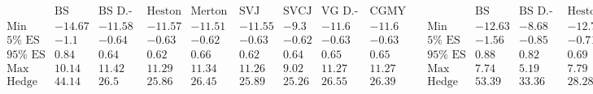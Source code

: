 \documentclass{article}
\begin{document}
\[\begin{array}{ccc}
\begin{array}{rrrrrrrrr}
 \text{} & \text{BS Delta} & \text{BS D.-Gamma} & \text{Heston D.-Vega} & \text{Merton D.-Gamma} & \text{SVJ D.-Vega} & \text{SVCJ D.-Vega} & \text{VG
D.-Gamma} & \text{CGMY D.-Gamma} \\
 \text{Min} & -14.67 & -11.58 & -11.57 & -11.51 & -11.55 & -9.3 & -11.6 & -11.6 \\
 \text{5$\%$ ES} & -1.1 & -0.64 & -0.63 & -0.62 & -0.63 & -0.62 & -0.63 & -0.63 \\
 \text{95$\%$ ES} & 0.84 & 0.64 & 0.62 & 0.66 & 0.62 & 0.64 & 0.65 & 0.65 \\
 \text{Max} & 10.14 & 11.42 & 11.29 & 11.34 & 11.26 & 9.02 & 11.27 & 11.27 \\
 \text{Hedge error} & 44.14 & 26.5 & 25.86 & 26.45 & 25.89 & 25.26 & 26.55 & 26.39 \\
\end{array}
 & 
\begin{array}{rrrrrrrrr}
 \text{} & \text{BS Delta} & \text{BS D.-Gamma} & \text{Heston D.-Vega} & \text{Merton D.-Vega} & \text{SVJ D.-Vega} & \text{SVCJ D.-Vega} & \text{VG
D.-Gamma} & \text{CGMY D.-Gamma} \\
 \text{Min} & -12.63 & -8.68 & -12.75 & -6.32 & -7.79 & -12.75 & -12.73 & -12.74 \\
 \text{5$\%$ ES} & -1.56 & -0.85 & -0.71 & -0.79 & -0.78 & -0.89 & -0.96 & -0.97 \\
 \text{95$\%$ ES} & 0.88 & 0.82 & 0.69 & 0.77 & 0.79 & 0.88 & 0.89 & 0.9 \\
 \text{Max} & 7.74 & 5.19 & 7.79 & 4.15 & 7.78 & 8.99 & 8.97 & 9.25 \\
 \text{Hedge error} & 53.39 & 33.36 & 28.28 & 31.01 & 31.26 & 36.05 & 38.82 & 39.09 \\
\end{array}
 & 
\begin{array}{rrrrrrrrr}
 \text{} & \text{BS Delta} & \text{BS D.-Gamma} & \text{Heston D.-Vega} & \text{Merton D.-Gamma} & \text{SVJ D.-Gamma} & \text{SVCJ D.-Gamma} & \text{VG
D.-Gamma} & \text{CGMY D.-Gamma} \\
 \text{Min} & -13.53 & -7.89 & -7.9 & -14.3 & -11.76 & -11.75 & -20.99 & -11.72 \\
 \text{5$\%$ ES} & -2.77 & -1.18 & -1.26 & -1.34 & -1.36 & -1.39 & -1.26 & -1.25 \\
 \text{95$\%$ ES} & 0.87 & 0.71 & 0.68 & 0.78 & 0.94 & 0.93 & 0.73 & 0.73 \\
 \text{Max} & 13.48 & 10.78 & 10.77 & 13.6 & 13.66 & 13.6 & 13.67 & 13.65 \\
 \text{Hedge error} & 88.42 & 38.24 & 39.34 & 43.95 & 48. & 49.06 & 42.99 & 41.27 \\
\end{array}
 \\
\end{array}\]
\end{document}
